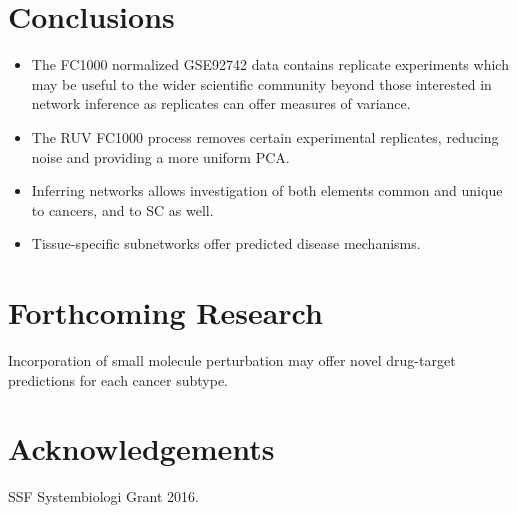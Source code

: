 \documentclass[a0,portrait]{a0poster}
\begin{document}
\begin{multicols}{2}
\color{SaddleBrown} %

\section*{Conclusions}

\begin{itemize}
\item The FC1000 normalized GSE92742 data contains replicate experiments which may be useful to the wider scientific community beyond those interested in network inference as replicates can offer measures of variance. 
\item The RUV FC1000 process removes certain experimental replicates, reducing noise and providing a more uniform PCA.
\item Inferring networks allows investigation of both elements common and unique to cancers, and to SC as well.
\item Tissue-specific subnetworks offer predicted disease mechanisms.
\end{itemize}

\color{DarkSlateGray} %


\section*{Forthcoming Research}

Incorporation of small molecule perturbation may offer novel drug-target predictions for each cancer subtype.




\section*{Acknowledgements}

SSF Systembiologi Grant 2016.


\end{multicols}
\end{document}

